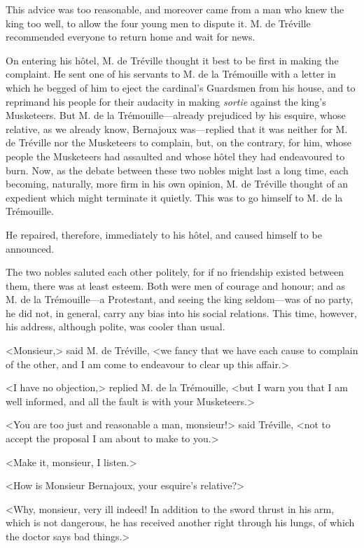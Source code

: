 This advice was too reasonable, and moreover came from a man who knew the king too well, to allow the four young men to dispute it. M. de Tréville recommended everyone to return home and wait for news. 

On entering his hôtel, M. de Tréville thought it best to be first in making the complaint. He sent one of his servants to M. de la Trémouille with a letter in which he begged of him to eject the cardinal's Guardsmen from his house, and to reprimand his people for their audacity in making \textit{sortie} against the king's Musketeers. But M. de la Trémouille---already prejudiced by his esquire, whose relative, as we already know, Bernajoux was---replied that it was neither for M. de Tréville nor the Musketeers to complain, but, on the contrary, for him, whose people the Musketeers had assaulted and whose hôtel they had endeavoured to burn. Now, as the debate between these two nobles might last a long time, each becoming, naturally, more firm in his own opinion, M. de Tréville thought of an expedient which might terminate it quietly. This was to go himself to M. de la Trémouille. 

He repaired, therefore, immediately to his hôtel, and caused himself to be announced. 

The two nobles saluted each other politely, for if no friendship existed between them, there was at least esteem. Both were men of courage and honour; and as M. de la Trémouille---a Protestant, and seeing the king seldom---was of no party, he did not, in general, carry any bias into his social relations. This time, however, his address, although polite, was cooler than usual. 

<Monsieur,> said M. de Tréville, <we fancy that we have each cause to complain of the other, and I am come to endeavour to clear up this affair.> 

<I have no objection,> replied M. de la Trémouille, <but I warn you that I am well informed, and all the fault is with your Musketeers.> 

<You are too just and reasonable a man, monsieur!> said Tréville, <not to accept the proposal I am about to make to you.> 

<Make it, monsieur, I listen.> 

<How is Monsieur Bernajoux, your esquire's relative?> 

<Why, monsieur, very ill indeed! In addition to the sword thrust in his arm, which is not dangerous, he has received another right through his lungs, of which the doctor says bad things.> 

